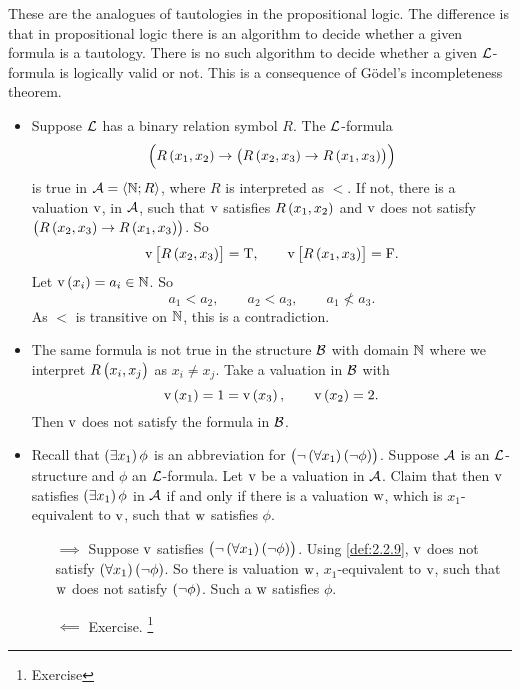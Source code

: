 These are the analogues of tautologies in the propositional logic. The difference is that in propositional logic there is an algorithm to decide whether a given formula is a tautology. There is no such algorithm to decide whether a given $ \mathcal{L} $-formula is logically valid or not. This is a consequence of G\"odel's incompleteness theorem.

\pagebreak

\begin{example}
\hfill
\begin{itemize}
\item Suppose $ \mathcal{L} $ has a binary relation symbol $ R $. The $ \mathcal{L} $-formula
$$ \impb{R\br{x_1, x_2}}{\impb{R\br{x_2, x_3}}{R\br{x_1, x_3}}} $$
is true in $ \mathcal{A} = \left\langle \mathbb{N}; R \right\rangle $, where $ R $ is interpreted as $ < $. If not, there is a valuation $ \mathrm{v} $, in $ \mathcal{A} $, such that $ \mathrm{v} $ satisfies $ R\br{x_1, x_2} $ and $ \mathrm{v} $ does not satisfy $ \impb{R\br{x_2, x_3}}{R\br{x_1, x_3}} $. So
$$ \v\sbr{R\br{x_2, x_3}} = \T, \qquad \v\sbr{R\br{x_1, x_3}} = \F. $$
Let $ \v\br{x_i} = a_i \in \NN $. So
$$ a_1 < a_2, \qquad a_2 < a_3, \qquad a_1 \not< a_3. $$
As $ < $ is transitive on $ \mathbb{N} $, this is a contradiction.
\item The same formula is not true in the structure $ \mathcal{B} $ with domain $ \mathbb{N} $ where we interpret $ R\br{x_i, x_j} $ as $ x_i \ne x_j $. Take a valuation in $ \mathcal{B} $ with
$$ \v\br{x_1} = 1 = \v\br{x_3}, \qquad \v\br{x_2} = 2. $$
Then $ \mathrm{v} $ does not satisfy the formula in $ \mathcal{B} $.
\item Recall that $ \teb{x_1}\phi $ is an abbreviation for $ \notb{\fab{x_1}\notb{\phi}} $. Suppose $ \mathcal{A} $ is an $ \mathcal{L} $-structure and $ \phi $ an $ \mathcal{L} $-formula. Let $ \mathrm{v} $ be a valuation in $ \mathcal{A} $. Claim that then $ \mathrm{v} $ satisfies $ \teb{x_1}\phi $ in $ \mathcal{A} $ if and only if there is a valuation $ \mathrm{w} $, which is $ x_1 $-equivalent to $ \mathrm{v} $, such that $ \mathrm{w} $ satisfies $ \phi $.
\begin{itemize}
\item[$ \implies $] Suppose $ \mathrm{v} $ satisfies $ \notb{\fab{x_1}\notb{\phi}} $. Using \ref{def:2.2.9}, $ \mathrm{v} $ does not satisfy $ \fab{x_1}\notb{\phi} $. So there is valuation $ \mathrm{w} $, $ x_1 $-equivalent to $ \mathrm{v} $, such that $ \mathrm{w} $ does not satisfy $ \notb{\phi} $. Such a $ \mathrm{w} $ satisfies $ \phi $.
\item[$ \impliedby $] Exercise. \footnote{Exercise}
\end{itemize}
\end{itemize}
\end{example}

